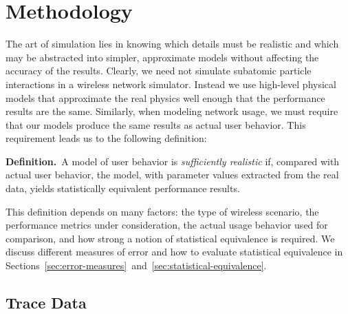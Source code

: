 \documentclass[conference]{IEEEtran}
\begin{document}

\section{Methodology}\label{sec:methodology}

The art of simulation lies in knowing which details must be realistic and which may be abstracted into simpler, approximate models without affecting the accuracy of the results. Clearly, we need not simulate subatomic particle interactions in a wireless network simulator. Instead we use high-level physical models that approximate the real physics well enough that the performance results are the same. Similarly, when modeling network usage, we must require that our models produce the same results as actual user behavior. This requirement leads us to the following definition:

\vspace{0.5em}
\begin{samepage}
\noindent\textbf{Definition.}~A model of user behavior is \textit{sufficiently realistic} if, compared with actual user behavior, the model, with parameter values extracted from the real data, yields statistically equivalent performance results.
\end{samepage}
\vspace{0.5em}

This definition depends on many factors: the type of wireless scenario, the performance metrics under consideration, the actual usage behavior used for comparison, and how strong a notion of statistical equivalence is required. We discuss different measures of error and how to evaluate statistical equivalence in Sections~\ref{sec:error-measures}~and~\ref{sec:statistical-equivalence}.

\subsection{Trace Data}\label{sec:trace-data}
\end{document}
